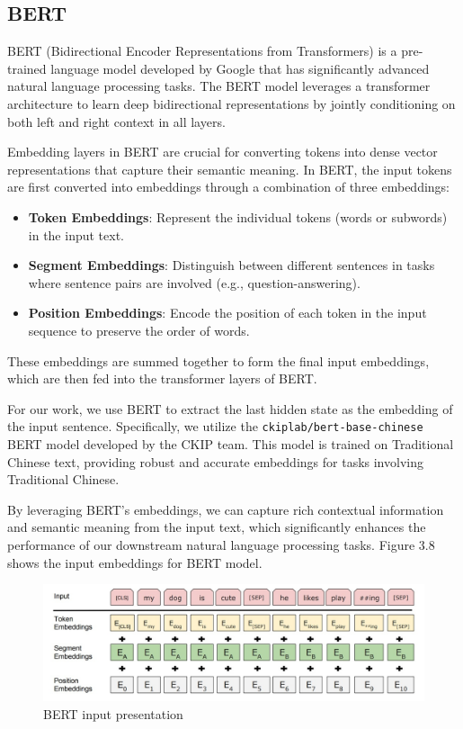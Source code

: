 \documentclass[PhD]{PHlab-thesis}
\begin{document}
\subsection{BERT}
BERT (Bidirectional Encoder Representations from Transformers) is a pre-trained language model developed by Google that has significantly advanced natural language processing tasks. The BERT model leverages a transformer architecture to learn deep bidirectional representations by jointly conditioning on both left and right context in all layers.

Embedding layers in BERT are crucial for converting tokens into dense vector representations that capture their semantic meaning. In BERT, the input tokens are first converted into embeddings through a combination of three embeddings:

\begin{itemize}
    \item \textbf{Token Embeddings}: Represent the individual tokens (words or subwords) in the input text.
    \item \textbf{Segment Embeddings}: Distinguish between different sentences in tasks where sentence pairs are involved (e.g., question-answering).
    \item \textbf{Position Embeddings}: Encode the position of each token in the input sequence to preserve the order of words.
\end{itemize}

These embeddings are summed together to form the final input embeddings, which are then fed into the transformer layers of BERT.

For our work, we use BERT to extract the last hidden state as the embedding of the input sentence. Specifically, we utilize the \texttt{ckiplab/bert-base-chinese} BERT model developed by the CKIP team. This model is trained on Traditional Chinese text, providing robust and accurate embeddings for tasks involving Traditional Chinese.

By leveraging BERT's embeddings, we can capture rich contextual information and semantic meaning from the input text, which significantly enhances the performance of our downstream natural language processing tasks.
Figure 3.8 shows the input embeddings for BERT model.

\begin{figure}[h!]
  \centering
  \includegraphics[width=\linewidth]{fig_3_bert_presentation.jpg}
  \captionsetup{type=figure}
  \caption{BERT input presentation}
  \label{fig:bert_presentation}
\end{figure}
\end{document}
